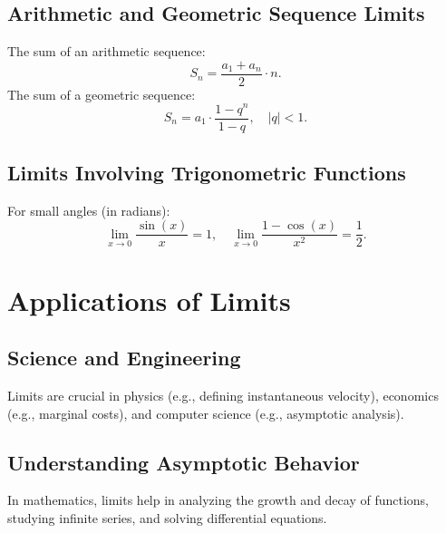 \documentclass[12pt,a4paper]{article}
\begin{document}
\subsection{Arithmetic and Geometric Sequence Limits}
The sum of an arithmetic sequence:
\[
S_n = \frac{a_1 + a_n}{2} \cdot n.
\]
The sum of a geometric sequence:
\[
S_n = a_1 \cdot \frac{1-q^n}{1-q}, \quad |q| < 1.
\]

\subsection{Limits Involving Trigonometric Functions}
For small angles (in radians):
\[
\lim_{x \to 0} \frac{\sin(x)}{x} = 1, \quad \lim_{x \to 0} \frac{1 - \cos(x)}{x^2} = \frac{1}{2}.
\]

\section{Applications of Limits}

\subsection{Science and Engineering}
Limits are crucial in physics (e.g., defining instantaneous velocity), economics (e.g., marginal costs), and computer science (e.g., asymptotic analysis).

\subsection{Understanding Asymptotic Behavior}
In mathematics, limits help in analyzing the growth and decay of functions, studying infinite series, and solving differential equations.
\end{document}
